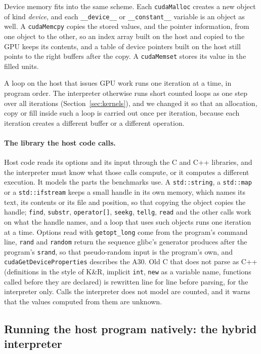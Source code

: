 \documentclass[11pt]{article}
\newcommand{\secref}[1]{Section~\ref{#1}}
\newcommand{\code}[1]{\texttt{#1}}
\begin{document}
Device memory fits into the same scheme. Each \code{cudaMalloc} creates a new object of kind \emph{device}, and
each \code{\_\_device\_\_} or \code{\_\_constant\_\_} variable is an object as well. A \code{cudaMemcpy} copies the
stored values, and the pointer information, from one object to the other, so an index array built on the host and
copied to the GPU keeps its contents, and a table of device pointers built on the host still points to the right
buffers after the copy. A \code{cudaMemset} stores its value in the filled units.

A loop on the host that issues GPU work runs one iteration at a time, in program order. The interpreter otherwise
runs short counted loops as one step over all iterations (\secref{sec:kernels}), and we changed it so that an
allocation, copy or fill inside such a loop is carried out once per iteration, because each iteration creates a
different buffer or a different operation.

\paragraph{The library the host code calls.} Host code reads its options and its input through the C and C++
libraries, and the interpreter must know what those calls compute, or it computes a different execution. It models
the parts the benchmarks use. A \code{std::string}, a \code{std::map} or a \code{std::ifstream} keeps a small handle
in its own memory, which names its text, its contents or its file and position, so that copying the object copies
the handle; \code{find}, \code{substr}, \code{operator[]}, \code{seekg}, \code{tellg}, \code{read} and the other
calls work on what the handle names, and a loop that uses such objects runs one iteration at a time. Options read
with \code{getopt\_long} come from the program's command line, \code{rand} and \code{random} return the sequence
glibc's generator produces after the program's \code{srand}, so that pseudo-random input is the program's own, and
\code{cudaGetDeviceProperties} describes the A30. Old C that does not parse as C++ (definitions in the style of K\&R,
implicit \code{int}, \code{new} as a variable name, functions called before they are declared) is rewritten line for
line before parsing, for the interpreter only. Calls the interpreter does not model are counted, and it warns that
the values computed from them are unknown.

\subsection{Running the host program natively: the hybrid interpreter}
\label{sec:hybrid}
\end{document}
